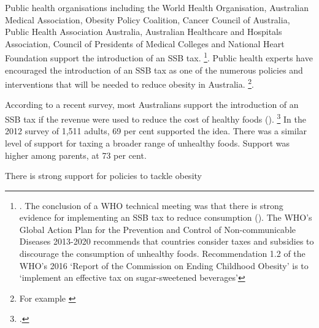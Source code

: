\documentclass[embargoed]{grattan}
\begin{document}
Public health organisations including the World Health Organisation, Australian Medical Association, Obesity Policy Coalition, Cancer Council of Australia, Public Health Association Australia, Australian Healthcare and Hospitals Association, Council of Presidents of Medical Colleges and National Heart Foundation support the introduction of an SSB tax.%
\footnote{\textcites{Coalition2016Policybriefcase}{Health2016Insufficientphysicalactivity}{Health2016Insufficientphysicalactivity}.
The conclusion of a WHO technical meeting was that there is strong evidence for implementing an SSB tax to reduce consumption (\textcite{Organization2016FiscalPoliciesDiet}).
The WHO's Global Action Plan for the Prevention and Control of Non-communicable Diseases 2013-2020 recommends that countries consider taxes and subsidies to discourage the consumption of unhealthy foods.
Recommendation 1.2 of the WHO's 2016 `Report of the Commission on Ending Childhood Obesity' is to `implement an effective tax on sugar-sweetened beverages'}. Public health experts have encouraged the introduction of an SSB tax as one of the numerous policies and interventions that will be needed to reduce obesity in Australia.%
\footnote{For example \textcites{Brownell2009Ouncespreventionthepublic}{Veerman2016ImpactTaxSugar}{Sharma2014effectstaxingsugarsweetened}{NiMhurchu2014Twentypercenttax}{Kaplin2013Usingeconomicpolicy}{Long2015Costeffectivenesssugar}{Cawley2015IncidenceTaxesSugar}}.

According to a recent survey, most Australians support the introduction of an SSB tax if the revenue were used to reduce the cost of healthy foods ().%
\footcite{Morley2012Publicopinionfood} In the 2012 survey of 1,511 adults, 69 per cent supported the idea.
There was a similar level of support for taxing a broader range of unhealthy foods.
Support was higher among parents, at 73 per cent. 

\begin{table}
\caption{There is strong support for policies to tackle obesity} \label{tbl:There-is-strong-support-for-policies-to-tackle-obesity}




\end{table}
\end{document}
